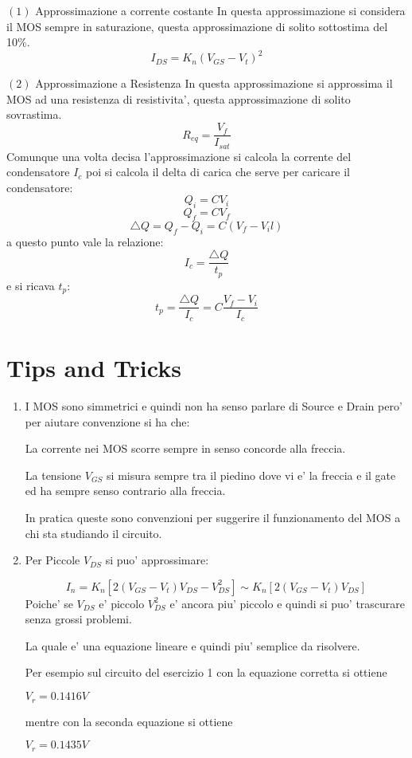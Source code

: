 \documentclass[\main/main.tex]{subfiles}
\begin{document}
$(1)$ Approssimazione a corrente costante
In questa approssimazione si considera il MOS sempre in saturazione, questa approssimazione di solito sottostima del 10\%.
\[ I_{DS} = K_n \left( V_{GS} - V_t \right)^2\]

$(2)$ Approssimazione a Resistenza
In questa approssimazione si approssima il MOS ad una resistenza di resistivita', questa approssimazione di solito sovrastima.
\[R_{eq} = \frac{V_f}{I_{sat}} \]
Comunque una volta decisa l'approssimazione si calcola la corrente del condensatore $I_c$ poi si calcola il delta di carica che serve per caricare il condensatore:
\[Q_i = C V_i\]
\[Q_f = C V_f\]
\[\bigtriangleup Q = Q_f - Q_i = C \left( V_f - V_il\right) \]
a questo punto vale la relazione:
\[I_c = \frac{\bigtriangleup Q}{t_p}\]
e si ricava $t_p$:
\[t_p = \frac{\bigtriangleup Q}{I_c} = C \frac{V_f - V_i}{I_c}\]



\section{Tips and Tricks}
\begin{enumerate}
	\item I MOS sono simmetrici e quindi non ha senso parlare di Source e Drain pero' per aiutare convenzione si ha che:

	      La corrente nei MOS scorre sempre in senso concorde alla freccia.

	      La tensione $V_{GS}$ si misura sempre tra il piedino dove vi e' la freccia e il gate ed ha sempre senso contrario alla freccia.

	      In pratica queste sono convenzioni per suggerire il funzionamento del MOS a chi sta studiando il circuito.

	\item Per Piccole $V_{DS}$ si puo' approssimare:

	      \[I_n = K_n \left[ 2 \left( V_{GS} -V_t \right)V_{DS} - V_{DS}^2 \right] \sim K_n \left[ 2 \left( V_{GS} -V_t \right)V_{DS} \right]\]
	      Poiche' se $V_{DS}$ e' piccolo $V_{DS}^2$ e' ancora piu' piccolo e quindi si puo' trascurare senza grossi problemi.

	      La quale e' una equazione lineare e quindi piu' semplice da risolvere.

	      Per esempio sul circuito del esercizio 1 con la equazione corretta si ottiene

	      $V_r = 0.1416V$

	      mentre con la seconda equazione si ottiene

	      $V_r = 0.1435V$
\end{enumerate}
\end{document}
